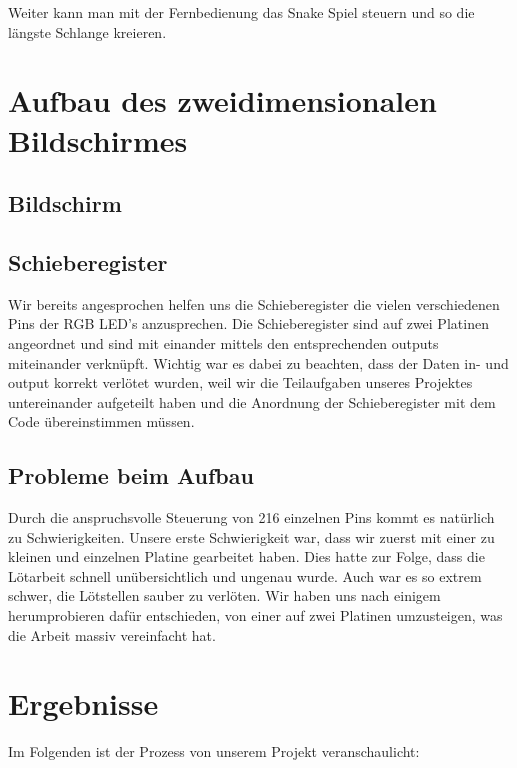 \documentclass[12pt,a4paper]{article}
\begin{document}
Weiter kann man mit der Fernbedienung das Snake Spiel steuern und so die längste Schlange kreieren.

\section{Aufbau des zweidimensionalen Bildschirmes}

\subsection{Bildschirm}

\subsection{Schieberegister}

Wir bereits angesprochen helfen uns die Schieberegister die vielen verschiedenen Pins der RGB LED's anzusprechen.
Die Schieberegister sind auf zwei Platinen angeordnet und sind mit einander mittels den entsprechenden outputs miteinander
verknüpft. Wichtig war es dabei zu beachten, dass der Daten in- und output korrekt verlötet wurden, weil wir die Teilaufgaben
unseres Projektes untereinander aufgeteilt haben und die Anordnung der Schieberegister mit dem Code übereinstimmen müssen.

\subsection{Probleme beim Aufbau}

Durch die anspruchsvolle Steuerung von 216 einzelnen Pins kommt es
natürlich zu Schwierigkeiten. Unsere erste Schwierigkeit war, dass wir 
zuerst mit einer zu kleinen und einzelnen Platine gearbeitet haben. 
Dies hatte zur Folge, dass die Lötarbeit schnell unübersichtlich und ungenau wurde.
Auch war es so extrem schwer, die Lötstellen sauber zu verlöten. Wir haben uns nach einigem herumprobieren dafür entschieden, von einer auf zwei Platinen umzusteigen, was die Arbeit massiv vereinfacht hat.

\newpage
\section{Ergebnisse}

Im Folgenden ist der Prozess von unserem Projekt veranschaulicht: \\\\
\end{document}

